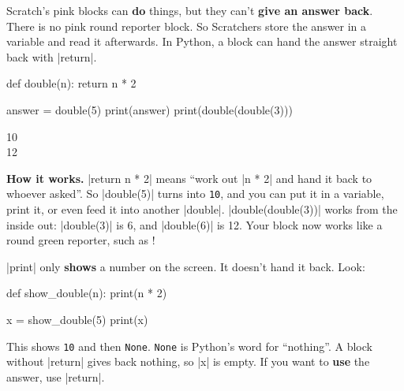 Scratch's pink blocks can \textbf{do} things, but they can't \textbf{give an answer back}. There is no pink round reporter block. So Scratchers store the answer in a variable and read it afterwards. In Python, a block can hand the answer straight back with \py|return|.

\begin{tcbraster}[raster columns=2, raster equal height=rows, raster column skip=12pt, raster valign=center, raster force size=false, raster column 1/.style={add to width=-2cm}, raster column 2/.style={add to width=2cm}]
\begin{tcolorbox}[colback=white, colframe=white, boxrule=0pt, valign=center]
\begin{scratch}
\end{scratch}
\par\medskip
\begin{scratch}
\end{scratch}
\end{tcolorbox}
\begin{code}
def double(n):
    return n * 2

answer = double(5)
print(answer)
print(double(double(3)))
\end{code}
\end{tcbraster}

\begin{outputbox}
10\\
12
\end{outputbox}

\textbf{How it works.} \py|return n * 2| means ``work out \py|n * 2| and hand it back to whoever asked''. So \py|double(5)| turns into \texttt{10}, and you can put it in a variable, print it, or even feed it into another \py|double|. \py|double(double(3))| works from the inside out: \py|double(3)| is 6, and \py|double(6)| is 12. Your block now works like a round green reporter, such as !

\begin{watchout}
\py|print| only \textbf{shows} a number on the screen. It doesn't hand it back. Look:
\begin{code}
def show_double(n):
    print(n * 2)

x = show_double(5)
print(x)
\end{code}
This shows \texttt{10} and then \texttt{None}. \texttt{None} is Python's word for ``nothing''. A block without \py|return| gives back nothing, so \py|x| is empty. If you want to \textbf{use} the answer, use \py|return|.
\end{watchout}

